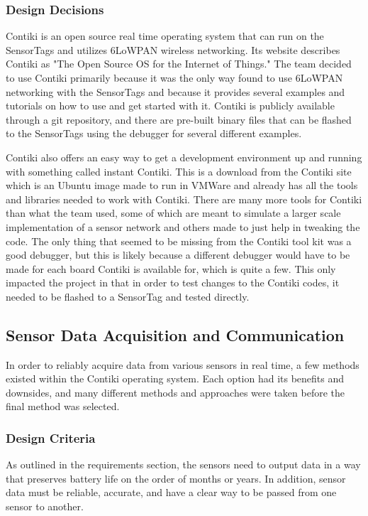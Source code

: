 \documentclass[PPFS.tex]{template/subfiles}
\begin{document}
\subsubsection{Design Decisions}
Contiki is an open source real time operating system that can run on the SensorTags and utilizes 6LoWPAN wireless networking. Its website describes Contiki as "The Open Source OS for the Internet of Things." The team decided to use Contiki primarily because it was the only way found to use 6LoWPAN networking with the SensorTags and because it provides several examples and tutorials on how to use and get started with it. Contiki is publicly available through a git repository, and there are pre-built binary files that can be flashed to the SensorTags using the debugger for several different examples.

Contiki also offers an easy way to get a development environment up and running with something called instant Contiki. This is a download from the Contiki site which is an Ubuntu image made to run in VMWare and already has all the tools and libraries needed to work with Contiki. There are many more tools for Contiki than what the team used, some of which are meant to simulate a larger scale implementation of a sensor network and others made to just help in tweaking the code. The only thing that seemed to be missing from the Contiki tool kit was a good debugger, but this is likely because a different debugger would have to be made for each board Contiki is available for, which is quite a few. This only impacted the project in that in order to test changes to the Contiki codes, it needed to be flashed to a SensorTag and tested directly.

\subsection{Sensor Data Acquisition and Communication}
In order to reliably acquire data from various sensors in real time, a few methods existed within the Contiki operating system. Each option had its benefits and downsides, and many different methods and approaches were taken before the final method was selected.

\subsubsection{Design Criteria}
As outlined in the requirements section, the sensors need to output data in a way that preserves battery life on the order of months or years. In addition, sensor data must be reliable, accurate, and have a clear way to be passed from one sensor to another.
\end{document}
